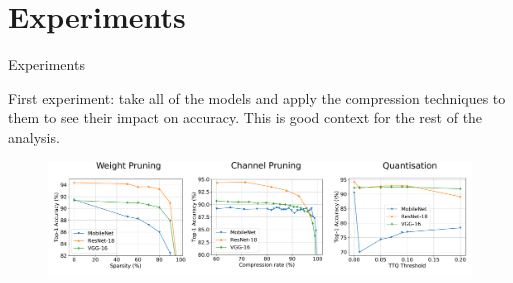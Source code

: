 \documentclass{beamer}
\begin{document}
\section{Experiments}

\begin{frame}{Experiments}

First experiment: take all of the models and apply the compression techniques to them to see their impact on accuracy.
This is good context for the rest of the analysis.
    
\begin{figure}
    \centering
    \includegraphics[width=11.75cm]{images/accuracies.pdf}
\end{figure}
    
\end{frame}








{ %
    \begin{frame}[plain]
     \end{frame}
}
\end{document}
